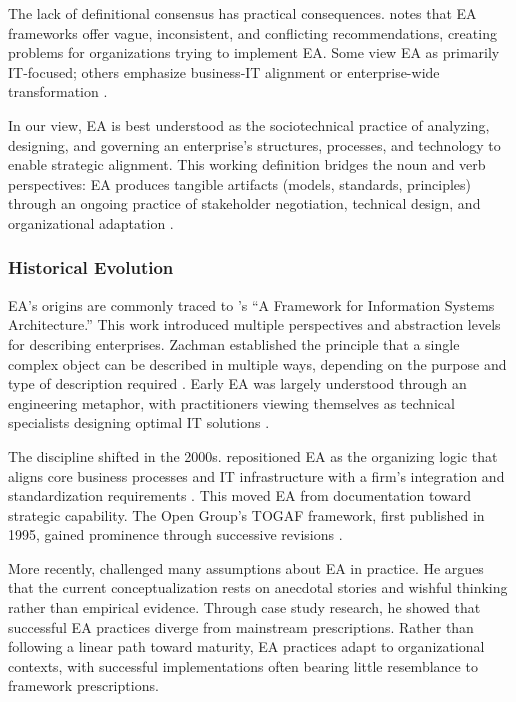 The lack of definitional consensus has practical consequences.
\textcite{kotusev_enterprise_2018} notes that EA frameworks offer vague,
inconsistent, and conflicting recommendations, creating problems for
organizations trying to implement EA. Some view EA as primarily IT-focused;
others emphasize business-IT alignment or enterprise-wide transformation
\parencite{gartner_gartner_2008, ross_enterprise_2006}.

In our view, EA is best understood as the sociotechnical practice of analyzing,
designing, and governing an enterprise's structures, processes, and technology
to enable strategic alignment. This working definition bridges the noun and verb
perspectives: EA produces tangible artifacts (models, standards, principles)
through an ongoing practice of stakeholder negotiation, technical design, and
organizational adaptation
\parencite{saint-louis_investigation_2019, the_open_group_togaf_2022, lankhorst_enterprise_2017}.

\subsubsection{Historical Evolution}\label{subsubsec:ea-history}

EA's origins are commonly traced to \textcite{zachman_zachman_1987}'s ``A
Framework for Information Systems Architecture.'' This work introduced multiple
perspectives and abstraction levels for describing enterprises. Zachman
established the principle that a single complex object can be described in
multiple ways, depending on the purpose and type of description required
\parencite{zachman_zachman_1987}. Early EA was largely understood through
an engineering metaphor, with practitioners viewing themselves as technical
specialists designing optimal IT solutions \parencite{spewak_enterprise_1993}.

The discipline shifted in the 2000s. \textcite{ross_enterprise_2006}
repositioned EA as the organizing logic that aligns core business processes and
IT infrastructure with a firm's integration and standardization requirements
\parencite{ross_enterprise_2006}. This moved
EA from documentation toward strategic capability. The Open Group's TOGAF
framework, first published in 1995, gained prominence through successive
revisions \parencite{the_open_group_togaf_2022}.

More recently, \textcite{kotusev_enterprise_2018} challenged many assumptions
about EA in practice. He argues that the current conceptualization rests on
anecdotal stories and wishful thinking rather than empirical evidence. Through
case study research, he showed that successful EA practices diverge from
mainstream prescriptions. Rather than following a linear path toward maturity,
EA practices adapt to organizational contexts, with successful implementations
often bearing little resemblance to framework prescriptions.


